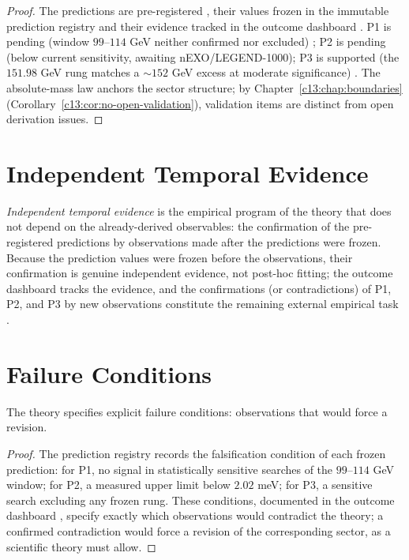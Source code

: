 \begin{proof}
The predictions are pre-registered \cite{c14:QG190}, their values frozen in the immutable
prediction registry and their evidence tracked in the outcome dashboard \cite{c14:QG202}. P1 is
pending (window $99$--$114$ GeV neither confirmed nor excluded) \cite{c14:QG199}; P2 is pending
(below current sensitivity, awaiting nEXO/LEGEND-1000); P3 is supported (the $151.98$ GeV
rung matches a $\sim152$ GeV excess at moderate significance) \cite{c14:QG200,c14:QG201}. The
absolute-mass law \cite{c14:QG203} anchors the sector structure; by
Chapter~\ref{c13:chap:boundaries} (Corollary~\ref{c13:cor:no-open-validation}), validation
items are distinct from open derivation issues.
\end{proof}

\section{Independent Temporal Evidence}
\label{c14:sec:temporal-evidence}

\emph{Independent temporal evidence} is the empirical program of the theory that does not
depend on the already-derived observables: the confirmation of the pre-registered
predictions \cite{c14:QG190} by observations made after the predictions were frozen. Because
the prediction values were frozen before the observations, their confirmation is genuine
independent evidence, not post-hoc fitting; the outcome dashboard \cite{c14:QG202} tracks
the evidence, and the confirmations (or contradictions) of P1, P2, and P3 by new
observations constitute the remaining external empirical task \cite{c14:QG299}.
\label{c14:thm:temporal-evidence}

\section{Failure Conditions}
\label{c14:sec:failure-conditions}

\begin{theorem}
\label{c14:thm:failure-conditions}
The theory specifies explicit failure conditions: observations that would force a revision.
\end{theorem}

\begin{proof}
The prediction registry \cite{c14:QG190} records the falsification condition of each frozen
prediction: for P1, no signal in statistically sensitive searches of the $99$--$114$ GeV
window; for P2, a measured upper limit below $2.02$ meV; for P3, a sensitive search
excluding any frozen rung. These conditions, documented in the outcome dashboard
\cite{c14:QG202}, specify exactly which observations would contradict the theory; a confirmed
contradiction would force a revision of the corresponding sector, as a scientific theory
must allow.
\end{proof}

